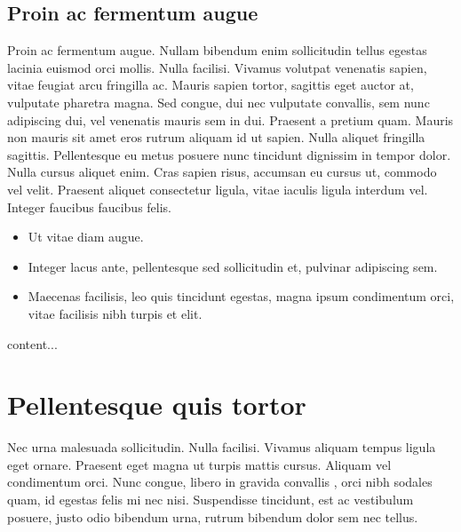 \documentclass[a4paper,UKenglish,cleveref, autoref]{lipics-v2019}
\begin{document}

\subsection{Proin ac fermentum augue}

Proin ac fermentum augue. Nullam bibendum enim sollicitudin tellus egestas lacinia euismod orci mollis. Nulla facilisi. Vivamus volutpat venenatis sapien, vitae feugiat arcu fringilla ac. Mauris sapien tortor, sagittis eget auctor at, vulputate pharetra magna. Sed congue, dui nec vulputate convallis, sem nunc adipiscing dui, vel venenatis mauris sem in dui. Praesent a pretium quam. Mauris non mauris sit amet eros rutrum aliquam id ut sapien. Nulla aliquet fringilla sagittis. Pellentesque eu metus posuere nunc tincidunt dignissim in tempor dolor. Nulla cursus aliquet enim. Cras sapien risus, accumsan eu cursus ut, commodo vel velit. Praesent aliquet consectetur ligula, vitae iaculis ligula interdum vel. Integer faucibus faucibus felis. 

\begin{itemize}
\item Ut vitae diam augue. 
\item Integer lacus ante, pellentesque sed sollicitudin et, pulvinar adipiscing sem. 
\item Maecenas facilisis, leo quis tincidunt egestas, magna ipsum condimentum orci, vitae facilisis nibh turpis et elit. 
\end{itemize}

\begin{remark}
content...
\end{remark}

\section{Pellentesque quis tortor}

Nec urna malesuada sollicitudin. Nulla facilisi. Vivamus aliquam tempus ligula eget ornare. Praesent eget magna ut turpis mattis cursus. Aliquam vel condimentum orci. Nunc congue, libero in gravida convallis , orci nibh sodales quam, id egestas felis mi nec nisi. Suspendisse tincidunt, est ac vestibulum posuere, justo odio bibendum urna, rutrum bibendum dolor sem nec tellus. 
\end{document}
